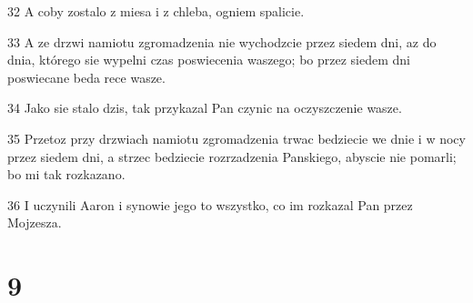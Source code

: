 \par 32 A coby zostalo z miesa i z chleba, ogniem spalicie.
\par 33 A ze drzwi namiotu zgromadzenia nie wychodzcie przez siedem dni, az do dnia, którego sie wypelni czas poswiecenia waszego; bo przez siedem dni poswiecane beda rece wasze.
\par 34 Jako sie stalo dzis, tak przykazal Pan czynic na oczyszczenie wasze.
\par 35 Przetoz przy drzwiach namiotu zgromadzenia trwac bedziecie we dnie i w nocy przez siedem dni, a strzec bedziecie rozrzadzenia Panskiego, abyscie nie pomarli; bo mi tak rozkazano.
\par 36 I uczynili Aaron i synowie jego to wszystko, co im rozkazal Pan przez Mojzesza.

\chapter{9}

